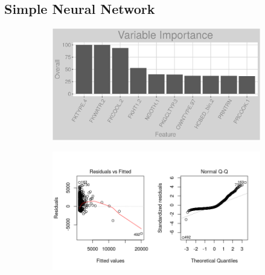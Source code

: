 \subsection{Simple Neural Network}
\label{appendix:fuel_oil:snn}
\begin{figure}[h]
\centering
\begin{subfigure}{1\textwidth}
\centering
\includegraphics[width=.99\textwidth, height=0.3\textheight]{Images/fuel_oil_nn_vars.png}
\end{subfigure}
\begin{subfigure}{1\textwidth}
\centering
\includegraphics[width=.99\textwidth, height=0.475\textheight]{Images/fuel_oil_nn_res_1.png}
\end{subfigure}
\end{figure}
\FloatBarrier
\newpage
